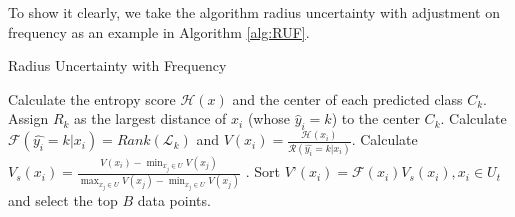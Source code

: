 To show it clearly, we take the algorithm radius uncertainty with adjustment on frequency as an example in Algorithm \ref{alg:RUF}.
\begin{algorithm}
	\scriptsize
	\small
\caption{Radius Uncertainty with Frequency}
\label{alg:RUF}
\begin{algorithmic}
\REPEAT 
\STATE Calculate the entropy score $\mathcal{H}(x)$ and the center of each predicted class $C_k$.
\STATE Assign $R_k$ as the largest distance of $x_i$ (whose $\hat{y}_i = k$) to the center $C_k$.
\STATE Calculate $\mathcal{F}(\hat{y_i} = k|x_i) = Rank(\mathcal{L}_k)$ and $V(x_i) = \frac{\mathcal{H}(x_i)}{\mathcal{R}(\hat{y_i}=k|x_i)}$.
\STATE  Calculate $V_s(x_i) = \frac{V(x_i)-\min_{x_j\in U}V(x_j)}{\max_{x_j\in U}V(x_j)-\min_{x_j\in U}V(x_j)}$ .
\STATE Sort $V’(x_i) = \mathcal{F}(x_i) V_s(x_i), x_i \in U_t$ and select the top $B$ data points.
\end{algorithmic}
\end{algorithm}
\vspace{-0.3cm}